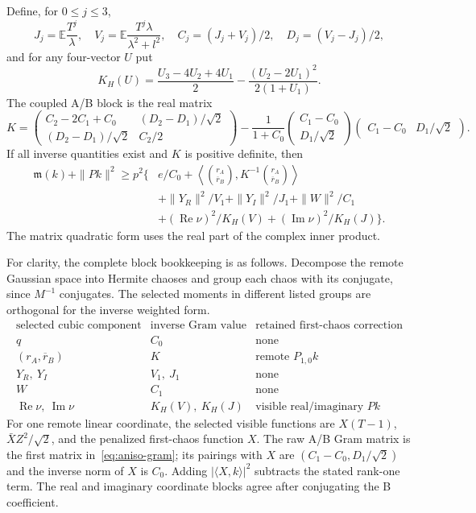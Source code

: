 Define, for $0\le j\le3$,
\[
 J_j=\mathbb E\frac{T^j}{\lambda},\quad
 V_j=\mathbb E\frac{T^j\lambda}{\lambda^2+l^2},\quad
 C_j=(J_j+V_j)/2,\quad D_j=(V_j-J_j)/2,
\]
and for any four-vector $U$ put
\[
 K_H(U)=\frac{U_3-4U_2+4U_1}{2}
             -\frac{(U_2-2U_1)^2}{2(1+U_1)}.
\]
The coupled A/B block is the real matrix
\begin{equation}\label{eq:aniso-gram}
 K=\begin{pmatrix}
 C_2-2C_1+C_0&(D_2-D_1)/\sqrt2\\
 (D_2-D_1)/\sqrt2&C_2/2
 \end{pmatrix}
 -\frac1{1+C_0}
 \begin{pmatrix}C_1-C_0\\D_1/\sqrt2\end{pmatrix}
 \begin{pmatrix}C_1-C_0&D_1/\sqrt2\end{pmatrix}.
\end{equation}
If all inverse quantities exist and $K$ is positive definite, then
\begin{equation}\label{eq:aniso-coercivity}
\boxed{\begin{aligned}
 \mathfrak m(k)+\|Pk\|^2\ge p^2\bigg\{&e/C_0+
 \left\langle\binom{r_A}{\overline r_B},
 K^{-1}\binom{r_A}{\overline r_B}\right\rangle\\
 &+\|Y_R\|^2/V_1+\|Y_I\|^2/J_1+\|W\|^2/C_1\\
 &+(\operatorname{Re}\nu)^2/K_H(V)
   +(\operatorname{Im}\nu)^2/K_H(J)\bigg\}.
\end{aligned}}
\end{equation}
The matrix quadratic form uses the real part of the complex inner product.

For clarity, the complete block bookkeeping is as follows. Decompose the
remote Gaussian space into Hermite chaoses and group each chaos with its
conjugate, since $M^{-1}$ conjugates. The selected moments in different
listed groups are orthogonal for the inverse weighted form.
\[
\begin{array}{c|c|c}
 \text{selected cubic component}&\text{inverse Gram value}
       &\text{retained first-chaos correction}\\\hline
 q&C_0&\text{none}\\
 (r_A,\overline r_B)&K&\text{remote }P_{1,0}k\\
 Y_R,\ Y_I&V_1,\ J_1&\text{none}\\
 W&C_1&\text{none}\\
 \operatorname{Re}\nu,\ \operatorname{Im}\nu&K_H(V),\ K_H(J)
       &\text{visible real/imaginary }Pk
\end{array}
\]
For one remote linear coordinate, the selected visible functions are
$X(T-1)$, $\bar XZ^2/\sqrt2$, and the penalized first-chaos function $X$.
The raw A/B Gram matrix is the first matrix in~\eqref{eq:aniso-gram};
its pairings with $X$ are $(C_1-C_0,D_1/\sqrt2)$ and the inverse norm
of $X$ is $C_0$. Adding $|\langle X,k\rangle|^2$ subtracts the stated
rank-one term. The real and imaginary coordinate blocks agree after
conjugating the B coefficient.

